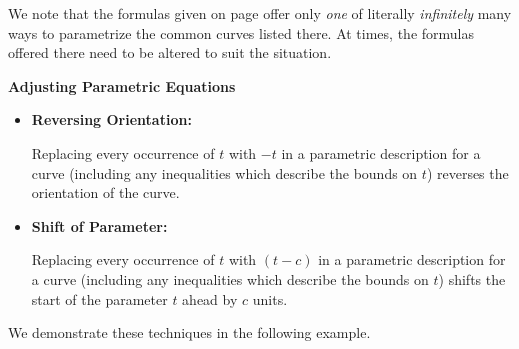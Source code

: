 \documentclass{ximera}
\begin{document}
We note that the formulas given on page \pageref{commonparametrizations} offer only \textit{one} of literally \textit{infinitely} many ways to parametrize the common curves listed there.  At times, the formulas offered there need to be altered to suit the situation.  

\smallskip

\colorbox{ResultColor}{\bbm

\centerline{\textbf{Adjusting Parametric Equations}}

\begin{itemize}

\item  \textbf{Reversing Orientation:}  $~$

Replacing every occurrence of $t$ with $-t$ in a parametric description for a curve (including any inequalities which describe the bounds on $t$) reverses the orientation of the curve.  

\item  \textbf{Shift of Parameter:}  $~$

Replacing every occurrence of $t$ with $(t-c)$ in a parametric description for a curve (including any inequalities which describe the bounds on $t$) shifts the start of the parameter $t$ ahead by $c$ units.

\end{itemize}

\smallskip

\ebm}

\medskip

We demonstrate these techniques in the following example.
\end{document}
